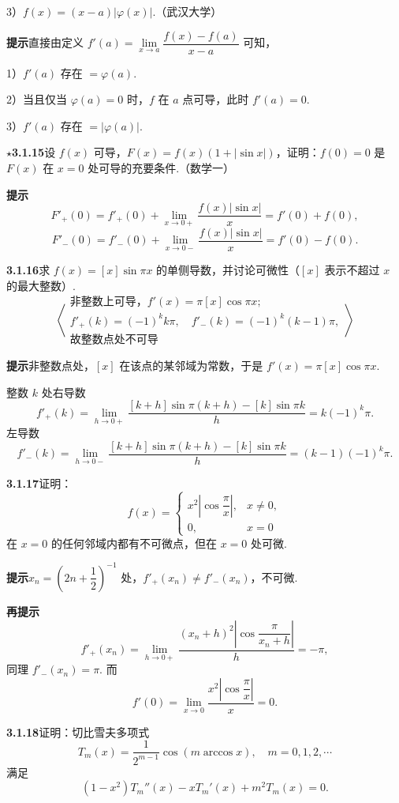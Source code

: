 \documentclass[UTF8, 12pt, fontset=fandol, oneside]{ctexart}
\begin{document}
3）$f(x)=(x-a)|\varphi(x)|$.（武汉大学）

\noindent\textbf{提示}\quad 直接由定义 $f'(a)=\lim\limits_{x\to a}\dfrac{f(x)-f(a)}{x-a}$ 可知，

1）$f'(a)$ 存在 $=\varphi(a)$.

2）当且仅当 $\varphi(a)=0$ 时，$f$ 在 $a$ 点可导，此时 $f'(a)=0$.

3）$f'(a)$ 存在 $=|\varphi(a)|$.

\noindent\textbf{$\star$3.1.15}\quad 设 $f(x)$ 可导，$F(x)=f(x)(1+|\sin x|)$，证明：$f(0)=0$ 是 $F(x)$ 在 $x=0$ 处可导的充要条件.（数学一）

\noindent\textbf{提示}\quad
\[
  F'_+(0)=f'_+(0)+\lim_{x\to0+}\frac{f(x)|\sin x|}{x}=f'(0)+f(0),
\]
\[
  F'_-(0)=f'_-(0)+\lim_{x\to0-}\frac{f(x)|\sin x|}{x}=f'(0)-f(0).
\]

\noindent\textbf{3.1.16}\quad 求 $f(x)=[x]\sin\pi x$ 的单侧导数，并讨论可微性（$[x]$ 表示不超过 $x$ 的最大整数）.
\[
  \left\langle
  \begin{array}{l}
  \text{非整数上可导，}f'(x)=\pi[x]\cos\pi x;\\
  f'_+(k)=(-1)^kk\pi,\quad f'_-(k)=(-1)^k(k-1)\pi,\\
  \text{故整数点处不可导}
  \end{array}
  \right\rangle
\]

\noindent\textbf{提示}\quad 非整数点处，$[x]$ 在该点的某邻域为常数，于是 $f'(x)=\pi[x]\cos\pi x$.

整数 $k$ 处右导数
\[
  f'_+(k)=\lim_{h\to0+}\frac{[k+h]\sin\pi(k+h)-[k]\sin\pi k}{h}
  =k(-1)^k\pi.
\]
左导数
\[
  f'_-(k)=\lim_{h\to0-}\frac{[k+h]\sin\pi(k+h)-[k]\sin\pi k}{h}
  =(k-1)(-1)^k\pi.
\]

\noindent\textbf{3.1.17}\quad 证明：
\[
  f(x)=
  \begin{cases}
  x^2\left|\cos\dfrac{\pi}{x}\right|, & x\ne0,\\
  0, & x=0
  \end{cases}
\]
在 $x=0$ 的任何邻域内都有不可微点，但在 $x=0$ 处可微.

\noindent\textbf{提示}\quad $x_n=\left(2n+\dfrac12\right)^{-1}$ 处，$f'_+(x_n)\ne f'_-(x_n)$，不可微.

\noindent\textbf{再提示}\quad
\[
  f'_+(x_n)=\lim_{h\to0+}\frac{(x_n+h)^2\left|\cos\dfrac{\pi}{x_n+h}\right|}{h}=-\pi,
\]
同理 $f'_-(x_n)=\pi$. 而
\[
  f'(0)=\lim_{x\to0}\frac{x^2\left|\cos\dfrac{\pi}{x}\right|}{x}=0.
\]

\noindent\textbf{3.1.18}\quad 证明：切比雪夫多项式
\[
  T_m(x)=\frac{1}{2^{m-1}}\cos(m\arccos x),\quad m=0,1,2,\cdots
\]
满足
\[
  (1-x^2)T_m''(x)-xT_m'(x)+m^2T_m(x)=0.
\]
\end{document}

